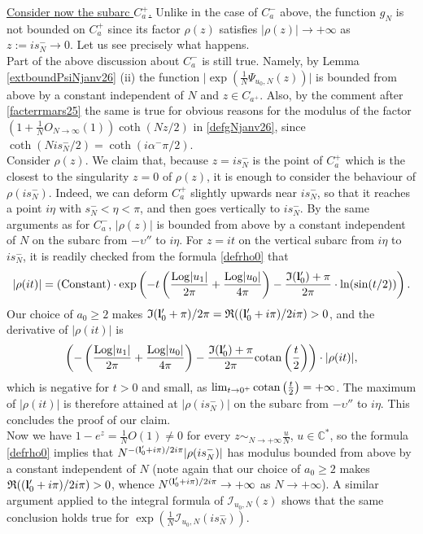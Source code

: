 \documentclass[11pt]{amsart}
\newcommand{\mc}{\mathbb{C}}
\newcommand{\Log}{{\rm Log}}
\newcommand{\ra}{\rightarrow}
\begin{document}
{\underline{Consider now the subarc $C_a^{+}$.} Unlike in the case of $C_a^-$ above, the function $g_N$ is not bounded on $C_a^+$ since its factor $\rho(z)$ satisfies $\vert \rho(z) \vert \to +\infty$ as $z:=is_N^-\to 0$. Let us see precisely what happens.\\
Part of the above discussion about $C_a^-$ is still true. Namely, by Lemma \ref{extboundPsiNjanv26} (ii) the function $\textstyle \vert \exp\left(\frac{1}{N}{\Psi_{u_0,N}}(z)\right) \vert$ is bounded from above by a constant independent of $N$ and $z\in C_{a^+}$. Also, by the comment after \eqref{facterrmars25} the same is true for obvious reasons for the modulus of the factor $\textstyle \left(1+\frac{1}{N}O_{N\ra \infty}\left(1\right)\right)\coth(Nz/2)$ in \eqref{defgNjanv26}, since $\coth(Nis_N^-/2) = \coth(i\alpha^-\pi/2)$.\\
Consider $\rho(z)$. We claim that, because $z=is_N^-$ is the point of $C_a^+$ which is the closest to the singularity $z=0$ of $\rho(z)$, it is enough to consider the behaviour of $\rho(is_N^-)$. Indeed, we can deform $C_a^+$ slightly upwards near $is_N^-$, so that it reaches a point $i\eta$ with $s_N^-< \eta< \pi$, and then goes vertically to $is_N^-$. By the same arguments as for $C_{a}^-$, $\vert \rho(z) \vert$ is bounded from above by a constant independent of $N$ on the subarc from $-\upsilon''$ to $i\eta$. For $z=it$ on the vertical subarc from $i\eta$ to $is_N^-$, it is readily checked from the formula \eqref{defrho0} that
$$\vert \rho(it) \vert = {\rm (Constant})\cdot \exp\left(-t\left(\frac{\Log\vert u_1\vert}{2\pi}+\frac{\Log\vert u_0\vert}{4\pi}\right)-\frac{\mathfrak{I}({\bf l}_0')+\pi}{2\pi}\cdot\ln(\sin(t/2))\right).$$
Our choice of $a_0\geq 2$ makes $\mathfrak{I}({\bf l}_0'+\pi)/2\pi = \mathfrak{R}(({\bf l}_0'+i\pi)/2i\pi) >0$, and the derivative of $\vert \rho(it) \vert$  is 
$$\left(-\left(\frac{\Log\vert u_1\vert}{2\pi}+\frac{\Log\vert u_0\vert}{4\pi}\right)-\frac{\mathfrak{I}({\bf l}_0')+\pi}{2\pi} {\rm cotan}\left(\frac{t}{2}\right)\right)\cdot\vert \rho(it) \vert,$$
which is negative for $t>0$ and small, as $\textstyle \lim_{t\to 0^+} {\rm cotan}\left(\frac{t}{2}\right) = +\infty$. The maximum of $\vert \rho(it) \vert$ is therefore attained at $\vert \rho(is_N^-)\vert$ on the subarc from $-\upsilon''$ to $i\eta$. This concludes the proof of our claim.\\
Now we have $1-e^{z} = \textstyle \frac{1}{N}O(1)\ne 0$ for every $\textstyle z\sim_{N\to +\infty} \frac{u}{N}$, $u\in \mc^*$, so the formula \eqref{defrho0} implies that $N^{-({\bf l}_0'+i\pi)/2i\pi}\vert \rho(is_N^-)\vert$ has modulus bounded from above by a constant independent of $N$ (note again that our choice of $a_0\geq 2$ makes $\mathfrak{R}(({\bf l}_0'+i\pi)/2i\pi) >0$, whence $N^{({\bf l}_0'+i\pi)/2i\pi}\to +\infty$ as $N\to +\infty$). A similar argument applied to the integral formula of ${\mathcal{I}_{u_0,N}(z)}$ shows that the same conclusion holds true for $\textstyle \exp\left(\frac{1}{N}{\mathcal{I}_{u_0,N}(is_N^-)}\right)$.\\
}
\end{document}
